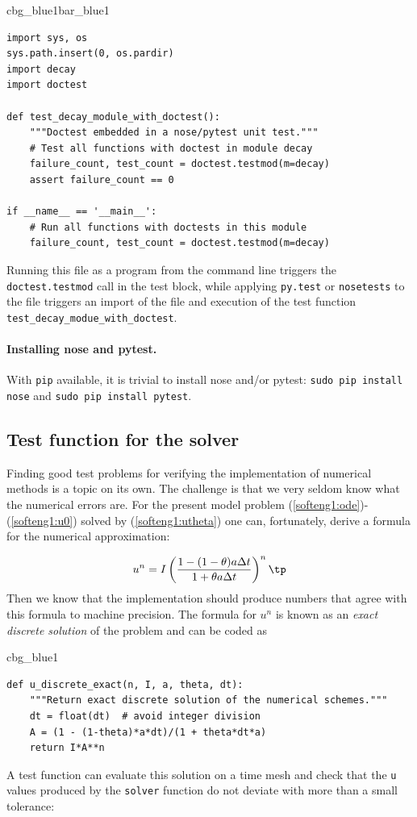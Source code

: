 \documentclass[%
oneside,                 %
final,                   %
10pt]{article}
\newenvironment{_cod_tight}[1]{
   \def\FrameCommand{\colorbox{#1}}
   \FrameRule0.6pt\MakeFramed {\FrameRestore}\vskip3mm}
   {\vskip0mm\endMakeFramed}
\newenvironment{cod}[1]{
\bgroup\rmfamily
\fboxsep=0mm\relax
\begin{_cod_tight}{#1}
\list{}{\parsep=-2mm\parskip=0mm\topsep=0pt\leftmargin=2mm
\rightmargin=2\leftmargin\leftmargin=4pt\relax}
\item\relax}
{\endlist\end{_cod_tight}\egroup}
\newenvironment{_pro_tight}[2]{
   \def\FrameCommand{\color{#2}\vrule width 1mm\normalcolor\colorbox{#1}}
   \FrameRule0.6pt\MakeFramed {\advance\hsize-2mm\FrameRestore}\vskip3mm}
   {\vskip0mm\endMakeFramed}
\newenvironment{pro}[2]{
\bgroup\rmfamily
\fboxsep=0mm\relax
\begin{_pro_tight}{#1}{#2}
\list{}{\parsep=-2mm\parskip=0mm\topsep=0pt\leftmargin=2mm
\rightmargin=2\leftmargin\leftmargin=4pt\relax}
\item\relax}
{\endlist\end{_pro_tight}\egroup}
\begin{document}
\begin{pro}{cbg_blue1}{bar_blue1}\begin{Verbatim}[numbers=none,fontsize=\fontsize{9pt}{9pt},baselinestretch=0.95,xleftmargin=2mm]
import sys, os
sys.path.insert(0, os.pardir)
import decay
import doctest

def test_decay_module_with_doctest():
    """Doctest embedded in a nose/pytest unit test."""
    # Test all functions with doctest in module decay
    failure_count, test_count = doctest.testmod(m=decay)
    assert failure_count == 0

if __name__ == '__main__':
    # Run all functions with doctests in this module
    failure_count, test_count = doctest.testmod(m=decay)
\end{Verbatim}
\end{pro}
\noindent
Running this file as a program from the command line
triggers the \texttt{doctest.testmod} call
in the test block, while applying \texttt{py.test} or \texttt{nosetests} to the file triggers
an import of the file and execution of the test function
\Verb!test_decay_modue_with_doctest!.

\paragraph{Installing nose and pytest.}
With \texttt{pip} available, it is trivial to install nose and/or pytest:
\texttt{sudo pip install nose} and \texttt{sudo pip install pytest}.

\subsection{Test function for the solver}

Finding good test problems for verifying the implementation of numerical
methods is a topic on its own. The challenge is that we very seldom know
what the numerical errors are. For the present model problem
(\ref{softeng1:ode})-(\ref{softeng1:u0}) solved by
(\ref{softeng1:utheta}) one can, fortunately, derive a formula for
the numerical approximation:

\[ u^n = I\left(
\frac{1 - (1-\theta) a\Delta t}{1 + \theta a \Delta t}
\right)^n\tp\]
Then we know that the implementation should
produce numbers that agree with this formula to machine precision.
The formula for $u^n$ is known as an \emph{exact discrete solution} of the
problem and can be coded as

\begin{cod}{cbg_blue1}\begin{Verbatim}[numbers=none,fontsize=\fontsize{9pt}{9pt},baselinestretch=0.95,xleftmargin=2mm]
def u_discrete_exact(n, I, a, theta, dt):
    """Return exact discrete solution of the numerical schemes."""
    dt = float(dt)  # avoid integer division
    A = (1 - (1-theta)*a*dt)/(1 + theta*dt*a)
    return I*A**n
\end{Verbatim}
\end{cod}
\noindent
A test function can evaluate this solution on a time mesh
and check that the \texttt{u} values produced by the \texttt{solver} function
do not deviate with more than a small tolerance:
\end{document}
